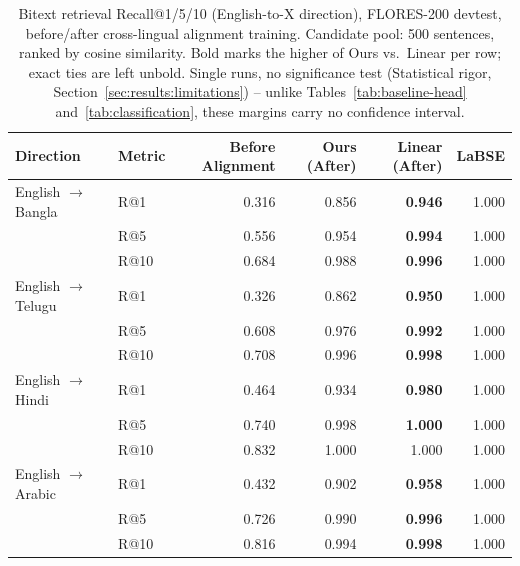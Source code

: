 \documentclass[manuscript]{acmart}
\begin{document}
\begin{table}[h]
\caption{Bitext retrieval Recall@1/5/10 (English-to-X direction), FLORES-200 devtest, before/after cross-lingual alignment training. Candidate pool: 500 sentences, ranked by cosine similarity. Bold marks the higher of Ours vs.\ Linear per row; exact ties are left unbold. Single runs, no significance test (Statistical rigor, Section~\ref{sec:results:limitations}) -- unlike Tables~\ref{tab:baseline-head} and~\ref{tab:classification}, these margins carry no confidence interval.}
\label{tab:bitext}
\begin{tabular}{@{}llrrrr@{}}
\toprule
Direction & Metric & Before Alignment & Ours (After) & Linear (After) & LaBSE \\
\midrule
English $\to$ Bangla & R@1  & 0.316 & 0.856 & \textbf{0.946} & 1.000 \\
                      & R@5  & 0.556 & 0.954 & \textbf{0.994} & 1.000 \\
                      & R@10 & 0.684 & 0.988 & \textbf{0.996} & 1.000 \\
\midrule
English $\to$ Telugu & R@1  & 0.326 & 0.862 & \textbf{0.950} & 1.000 \\
                      & R@5  & 0.608 & 0.976 & \textbf{0.992} & 1.000 \\
                      & R@10 & 0.708 & 0.996 & \textbf{0.998} & 1.000 \\
\midrule
English $\to$ Hindi  & R@1  & 0.464 & 0.934 & \textbf{0.980} & 1.000 \\
                      & R@5  & 0.740 & 0.998 & \textbf{1.000} & 1.000 \\
                      & R@10 & 0.832 & 1.000 & 1.000 & 1.000 \\
\midrule
English $\to$ Arabic & R@1  & 0.432 & 0.902 & \textbf{0.958} & 1.000 \\
                      & R@5  & 0.726 & 0.990 & \textbf{0.996} & 1.000 \\
                      & R@10 & 0.816 & 0.994 & \textbf{0.998} & 1.000 \\
\bottomrule
\end{tabular}
\end{table}
\end{document}
